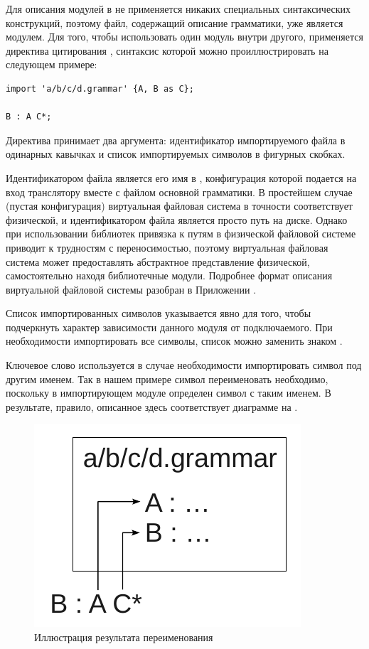 Для описания модулей в  не применяется никаких специальных синтаксических конструкций, поэтому файл, содержащий описание грамматики, уже является модулем. Для того, чтобы использовать один модуль внутри другого, применяется директива цитирования , синтаксис которой можно проиллюстрировать на следующем примере:
\begin{lstlisting}
import 'a/b/c/d.grammar' {A, B as C};

B : A C*;
\end{lstlisting}  
Директива  принимает два аргумента: идентификатор импортируемого файла в одинарных кавычках и список импортируемых символов в фигурных скобках. 

Идентификатором файла является его имя в , конфигурация которой подается на вход транслятору  вместе с файлом основной грамматики. В простейшем случае (пустая конфигурация) виртуальная файловая система в точности соответствует физической, и идентификатором файла является просто путь на диске. Однако при использовании библиотек привязка к путям в физической файловой системе приводит к трудностям с переносимостью, поэтому виртуальная файловая система может предоставлять абстрактное представление физической, самостоятельно находя библиотечные модули. Подробнее формат описания виртуальной файловой системы разобран в Приложении .

Список импортированных символов указывается явно для того, чтобы подчеркнуть характер зависимости данного модуля от подключаемого. При необходимости импортировать все символы, список можно заменить знаком \code{\{*\}}.

Ключевое слово  используется в случае необходимости импортировать символ под другим именем. Так в нашем примере символ  переименовать необходимо, поскольку в импортирующем модуле определен символ с таким именем. В результате, правило, описанное здесь соответствует диаграмме на .

\begin{figure}[htbp]
	\centering
	\includegraphics[width=.5\textwidth]{renaming.pdf}
	\caption{Иллюстрация результата переименования}\label{GRenaming}
\end{figure}


